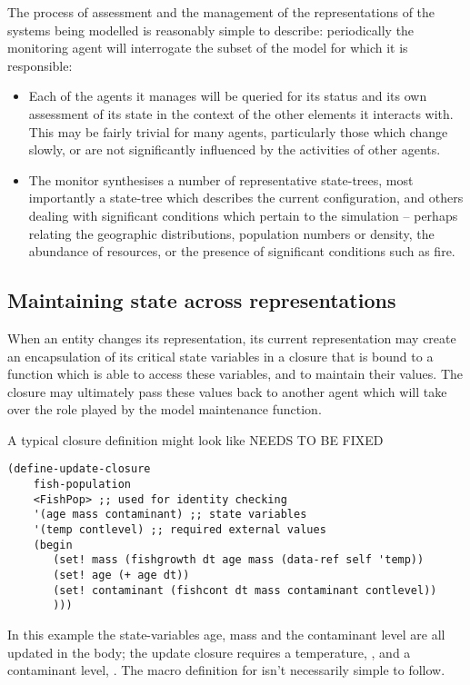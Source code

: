 The process of assessment and the management of the representations
of the systems being modelled is reasonably simple to describe:
periodically the monitoring agent will interrogate the subset of the
model for which it is responsible:
\begin{itemize}
\item[] Each of the agents it manages will be queried for its status
and its own assessment of its state in the context of the other
elements it interacts with.  This may be fairly trivial for many
agents, particularly those which change slowly, or are not
significantly influenced by the activities of other agents.
\item[] The monitor synthesises a number of representative
state-trees, most importantly a state-tree which describes the current
configuration, and others dealing with significant conditions which
pertain to the simulation -- perhaps relating the geographic
distributions, population numbers or density, the abundance of
resources, or the presence of significant conditions such as fire.
\end{itemize}


\subsection{Maintaining state across representations}

When an entity changes its representation, its current representation
may create an encapsulation of its critical state variables in a
closure that is bound to a function which is able to access these
variables, and to maintain their values. The closure may ultimately pass these
values back to another agent which will take over the role played by
the model maintenance function.

A typical closure definition might look like
{\Huge{NEEDS TO BE FIXED}}
\begin{verbatim}
(define-update-closure 
    fish-population
    <FishPop> ;; used for identity checking
    '(age mass contaminant) ;; state variables 
    '(temp contlevel) ;; required external values
    (begin
       (set! mass (fishgrowth dt age mass (data-ref self 'temp))
       (set! age (+ age dt))
       (set! contaminant (fishcont dt mass contaminant contlevel))
       )))
\end{verbatim}
In this example the state-variables age, mass and the contaminant
level are all updated in the body; the update closure requires a
temperature, , and a contaminant level, .
The macro definition for  isn't
necessarily simple to follow.

